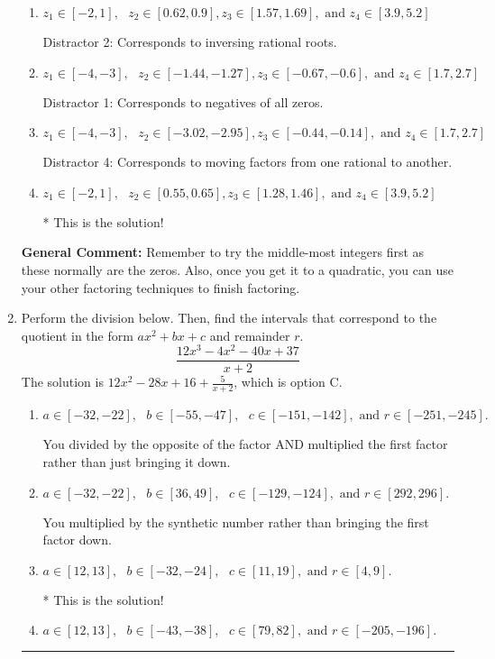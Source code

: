 \documentclass{extbook}[14pt]
\newcommand{\litem}[1]{\item #1

\rule{\textwidth}{0.4pt}}
\begin{document}
\begin{enumerate}
{\begin{enumerate}[label=\Alph*.]
 Distractor 3: Corresponds to negatives of all zeros AND inversing rational roots.
\item \( z_1 \in [-2, 1], \text{   }  z_2 \in [0.62, 0.9], z_3 \in [1.57, 1.69], \text{   and   } z_4 \in [3.9, 5.2] \)

 Distractor 2: Corresponds to inversing rational roots.
\item \( z_1 \in [-4, -3], \text{   }  z_2 \in [-1.44, -1.27], z_3 \in [-0.67, -0.6], \text{   and   } z_4 \in [1.7, 2.7] \)

 Distractor 1: Corresponds to negatives of all zeros.
\item \( z_1 \in [-4, -3], \text{   }  z_2 \in [-3.02, -2.95], z_3 \in [-0.44, -0.14], \text{   and   } z_4 \in [1.7, 2.7] \)

 Distractor 4: Corresponds to moving factors from one rational to another.
\item \( z_1 \in [-2, 1], \text{   }  z_2 \in [0.55, 0.65], z_3 \in [1.28, 1.46], \text{   and   } z_4 \in [3.9, 5.2] \)

* This is the solution!
\end{enumerate}

\textbf{General Comment:} Remember to try the middle-most integers first as these normally are the zeros. Also, once you get it to a quadratic, you can use your other factoring techniques to finish factoring.
}
\litem{
Perform the division below. Then, find the intervals that correspond to the quotient in the form $ax^2+bx+c$ and remainder $r$.
\[ \frac{12x^{3} -4 x^{2} -40 x + 37}{x + 2} \]The solution is \( 12x^{2} -28 x + 16 + \frac{5}{x + 2} \), which is option C.\begin{enumerate}[label=\Alph*.]
\item \( a \in [-32, -22], \text{   } b \in [-55, -47], \text{   } c \in [-151, -142], \text{   and   } r \in [-251, -245]. \)

 You divided by the opposite of the factor AND multiplied the first factor rather than just bringing it down.
\item \( a \in [-32, -22], \text{   } b \in [36, 49], \text{   } c \in [-129, -124], \text{   and   } r \in [292, 296]. \)

 You multiplied by the synthetic number rather than bringing the first factor down.
\item \( a \in [12, 13], \text{   } b \in [-32, -24], \text{   } c \in [11, 19], \text{   and   } r \in [4, 9]. \)

* This is the solution!
\item \( a \in [12, 13], \text{   } b \in [-43, -38], \text{   } c \in [79, 82], \text{   and   } r \in [-205, -196]. \)


\end{enumerate}}
\end{enumerate}
\end{document}
